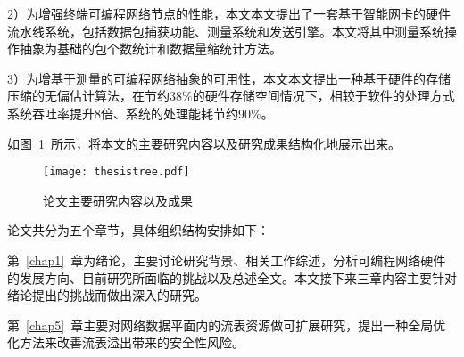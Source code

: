 2）为增强终端可编程网络节点的性能，本文本文提出了一套基于智能网卡的硬件流水线系统，包括数据包捕获功能、测量系统和发送引擎。本文将其中测量系统操作抽象为基础的包个数统计和数据量缩统计方法。

3）为增基于测量的可编程网络抽象的可用性，本文本文提出一种基于硬件的存储压缩的无偏估计算法，在节约38\%的硬件存储空间情况下，相较于软件的处理方式系统吞吐率提升8倍、系统的处理能耗节约90\%。



如图~\ref{fig:thesistree}~所示，将本文的主要研究内容以及研究成果结构化地展示出来。


\begin{figure}[!ht]
	\centering 
	\vspace{-1.5mm}
	\texttt{[image: thesistree.pdf]}
	\caption{论文主要研究内容以及成果} \label{fig:thesistree}
\end{figure}







\label{chap15}

论文共分为五个章节，具体组织结构安排如下：

第~\ref{chap1}~章为绪论，主要讨论研究背景、相关工作综述，分析可编程网络硬件的发展方向、目前研究所面临的挑战以及总述全文。本文接下来三章内容主要针对绪论提出的挑战而做出深入的研究。

第~\ref{chap5}~章主要对网络数据平面内的流表资源做可扩展研究，提出一种全局优化方法来改善流表溢出带来的安全性风险。

